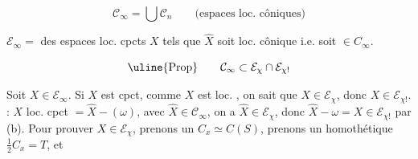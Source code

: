 \[
\mathcal C_\infty=\bigcup\mathcal C_n\qquad\text{(espaces loc. côniques)}
\]

$\mathcal E_\infty={}$  des espaces loc. cpcts  $X$ tels que $\hat X$ soit loc. cônique i.e. soit $\in C_\infty$.

\[
\text{\uline{Prop}}\qquad \mathcal C_\infty\subset\mathcal E_\chi\cap\mathcal E_{\chi!}
\]

Soit $X\in\mathcal E_\infty$. Si $X$ est cpct,  comme $X$ est loc. , on sait que $X\in\mathcal E_\chi$, donc $X\in\mathcal E_{\chi!}$.   : $X$ loc. cpct $=\hat X-(\omega)$, avec $\hat X\in\mathcal C_\infty$, on a $\hat X\in\mathcal E_\chi$, donc $\hat X-\omega=X\in\mathcal E_{\chi!}$ par (b). Pour prouver $X\in\mathcal E_\chi$, prenons un $C_x\simeq C(S)$, prenons un homothétique $\frac12 C_x=T$, et
